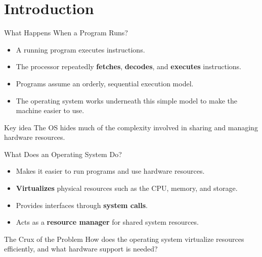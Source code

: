 \section{Introduction}

\begin{frame}{What Happens When a Program Runs?}
  \begin{itemize}
    \item A running program executes instructions.
    \item The processor repeatedly \textbf{fetches}, \textbf{decodes}, and \textbf{executes} instructions.
    \item Programs assume an orderly, sequential execution model.
    \item The operating system works underneath this simple model to make the machine easier to use.
  \end{itemize}

  \vspace{0.5em}
  \begin{block}{Key idea}
    The OS hides much of the complexity involved in sharing and managing hardware resources.
  \end{block}
\end{frame}

\begin{frame}{What Does an Operating System Do?}
  \begin{itemize}
    \item Makes it easier to run programs and use hardware resources.
    \item \textbf{Virtualizes} physical resources such as the CPU, memory, and storage.
    \item Provides interfaces through \textbf{system calls}.
    \item Acts as a \textbf{resource manager} for shared system resources.
  \end{itemize}

  \vspace{0.5em}
  \begin{alertblock}{The Crux of the Problem}
    How does the operating system virtualize resources efficiently, and what hardware support is needed?
  \end{alertblock}

\end{frame}

